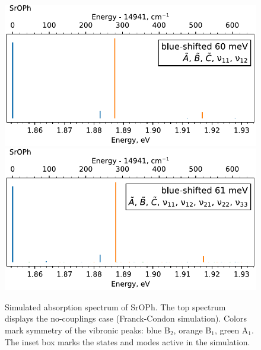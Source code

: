 \documentclass{article}
\begin{document}
\begin{figure}
    \begin{center}
        \includegraphics[width=12 cm]{figures/SrOPh_0t650_no_couplings.pdf}
        \includegraphics[width=12 cm]{figures/SrOPh_0t650.pdf}
    \end{center}
    \caption{
        Simulated absorption spectrum of SrOPh. The top spectrum displays the
        no-couplings case (Franck-Condon simulation). Colors mark symmetry of
        the vibronic peaks: blue B$_2$, orange B$_1$, green A$_1$. The inset
        box marks the states and modes active in the simulation.
    }
    \label{fig:SrOPh_0t650}
\end{figure}
\end{document}
